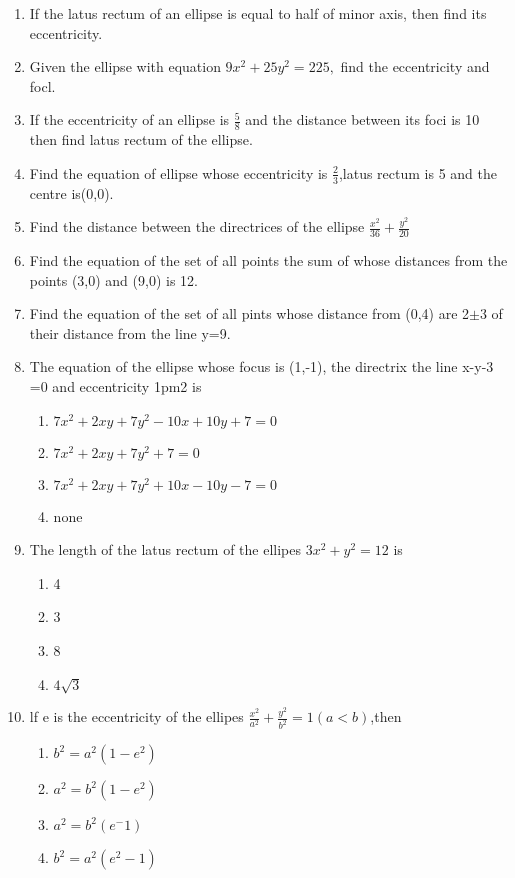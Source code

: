 \begin{enumerate}[label=\thesection.\arabic*,ref=\thesection.\theenumi]
 \item If the latus rectum of an ellipse is equal to half of minor axis, then find its eccentricity.
 \item Given the ellipse with equation $9x^2+25y^2=225,$ find the eccentricity and focl.
 \item If the eccentricity of an ellipse is $\frac{5}{8}$ and  the distance between its foci is 10 then find latus rectum of the ellipse.
 \item Find the equation of ellipse whose eccentricity is $\frac{2}{3}$,latus rectum is 5 and the centre is(0,0).
 \item Find the distance between the directrices of the ellipse $\frac{x^2}{36}+\frac{y^2}{20}$
\item Find the equation of the set of all points the sum of whose distances  from the points (3,0) and (9,0) is 12.
\item Find the equation of the set of all pints whose distance from (0,4) are 2$\pm$3 of their distance from the line y=9.
\item The equation of the ellipse whose focus is (1,-1), the directrix the line x-y-3
=0 and eccentricity 1pm2 is
\begin{enumerate}
\item $7x^2+2xy+7y^2-10x+10y+7=0$
\item $7x^2+2xy+7y^2+7=0$
\item $7x^2+2xy+7y^2+10x-10y-7=0$ 
\item none
\end{enumerate}
\item The length of the latus rectum of the ellipes $3x^2+y^2=12$ is
\begin{enumerate}
\item 4
\item 3
\item 8
\item $4\sqrt{3}$
\end{enumerate}
\item lf e is the eccentricity of the ellipes $\frac{x^2}{a^2}+\frac{y^2}{b^2}=1(a<b)$,then
\begin{enumerate}
\item $b^2=a^2(1-e^2)$
\item $a^2=b^2(1-e^2)$
\item $a^2=b^2(e^-1)$
\item $b^2=a^2(e^2-1)$
\end{enumerate}
\end{enumerate}
